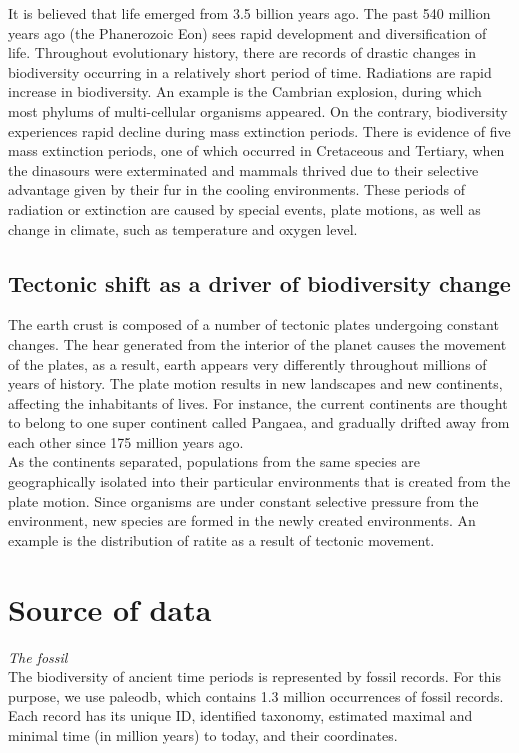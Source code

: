 \documentclass[11pt, a4paper,oneside,chapterprefix=false]{scrbook}
\begin{document}
It is believed that life emerged from 3.5 billion years ago. The past 540 million years ago (the Phanerozoic Eon) sees rapid development and diversification of life. Throughout evolutionary history, there are records of drastic changes in biodiversity occurring in a relatively short period of time. Radiations are rapid increase in biodiversity. An example is the Cambrian explosion, during which most phylums of multi-cellular organisms appeared. On the contrary, biodiversity experiences rapid decline during mass extinction periods. There is evidence of five mass extinction periods, one of which occurred in Cretaceous and Tertiary, when the dinasours were exterminated and mammals thrived due to their selective advantage given by their fur in the cooling environments. These periods of radiation or extinction are caused by special events, plate motions, as well as change in climate, such as temperature and oxygen level. \\

\subsection{Tectonic shift as a driver of biodiversity change} \label{subsec: two}
The earth crust is composed of a number of tectonic plates undergoing constant changes. The hear generated from the interior of the planet causes the movement of the plates, as a result, earth appears very differently throughout millions of years of history. The plate motion results in new landscapes and new continents, affecting the inhabitants of lives. For instance, the current continents are thought to belong to one super continent called Pangaea, and gradually drifted away from each other since 175 million years ago. \\

As the continents separated, populations from the same species are geographically isolated into their particular environments that is created from the plate motion. Since organisms are under constant selective pressure from the environment, new species are formed in the newly created environments. An example is the distribution of ratite as a result of tectonic movement. 

\section{Source of data} \label{sec:three}
\emph{The fossil}\\
The biodiversity of ancient time periods is represented by fossil records. For this purpose, we use paleodb, which contains 1.3 million occurrences of fossil records. Each record has its unique ID, identified taxonomy, estimated maximal and minimal time (in million years) to today, and their coordinates. \\
\end{document}
